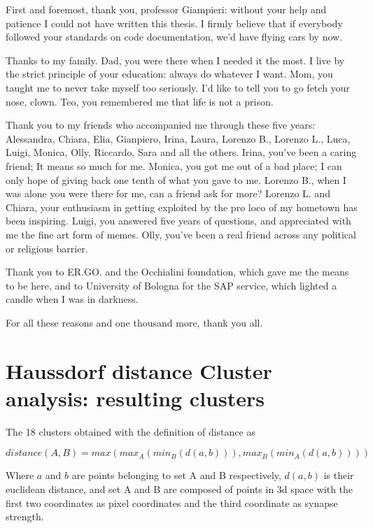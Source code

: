 \documentclass[a4paper]{report}
\begin{document}
First and foremost, thank you, professor Giampieri:
without your help and patience I could not have written this thesis.
I firmly believe that if everybody followed your standards on code documentation, we'd have flying cars by now.

Thanks to my family.
Dad, you were there when I needed it the most.
I live by the strict principle of your education:
always do whatever I want.
Mom, you taught me to never take myself too seriously.
I'd like to tell you to go fetch your nose, clown.
Teo, you remembered me that life is not a prison.

Thank you to my friends who accompanied me through these five years:
Alessandra, Chiara, Elia, Gianpiero, Irina, Laura, Lorenzo B., Lorenzo L., Luca, Luigi, Monica, Olly, Riccardo, Sara and all the others.
Irina, you've been a caring friend;
It means so much for me.
Monica, you got me out of a bad place;
I can only hope of giving back one tenth of what you gave to me.
Lorenzo B., when I was alone you were there for me, can a friend ask for more?
Lorenzo L. and Chiara, your enthusiasm in getting exploited by the pro loco of my hometown has been inspiring.
Luigi, you answered five years of questions, and appreciated with me the fine art form of memes.
Olly, you've been a real friend across any political or religious barrier.

Thank you to ER.GO. and the Occhialini foundation, which gave me the means to be here, and to University of Bologna for the SAP service, which lighted a candle when I was in darkness.

For all these reasons and one thousand more, thank you all.



\appendix

\chapter{Haussdorf distance Cluster analysis: resulting clusters}

The 18 clusters obtained with the definition of distance as

\begin{equation}
    distance(A, B) = max(max_A(min_B(d(a,b))), max_B(min_A(d(a,b))))
\end{equation}

Where $a$ and $b$ are points belonging to set A and B respectively, $d(a,b)$ is their euclidean distance, and set A and B are composed of points in 3d space with the first two coordinates as pixel coordinates and the third coordinate as synapse strength.
\end{document}
